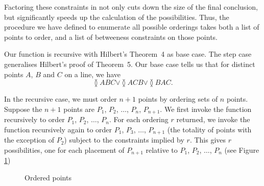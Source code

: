 Factoring these constraints in not only cuts down the size of the final conclusion, but significantly speeds up the calculation of the possibilities. Thus, the procedure we have defined to enumerate all possible orderings takes both a list of points to order, and a list of betweeness constraints on those points. 

Our function is recursive with Hilbert's Theorem~4 as base case. The step case generalises Hilbert's proof of Theorem~5. Our base case tells us that for distinct points $A$, $B$ and $C$ on a line, we have
\begin{displaymath}
\between{A}{B}{C} \vee \between{A}{C}{B} \vee \between{B}{A}{C}.
\end{displaymath}

In the recursive case, we must order $n+1$ points by ordering sets of $n$ points. Suppose the \mbox{$n+1$} points are $P_1$, $P_2$, $\ldots$, $P_n$, $P_{n + 1}$. We first invoke the function recursively to order $P_1$, $P_2$, $\ldots$, $P_{n}$. For each ordering $r$ returned, we invoke the function recursively again to order $P_1$, $P_3$, $\ldots$, $P_{n+1}$ (the totality of points with the exception of $P_2$) subject to the constraints implied by $r$. This gives $r$ possibilities, one for each placement of $P_{n+1}$ relative to $P_1$, $P_2$, $\ldots$, $P_n$ (see Figure \ref{fig:PointOrdering})

\begin{figure}




\caption{Ordered points}
\label{fig:PointOrdering}
\end{figure}

